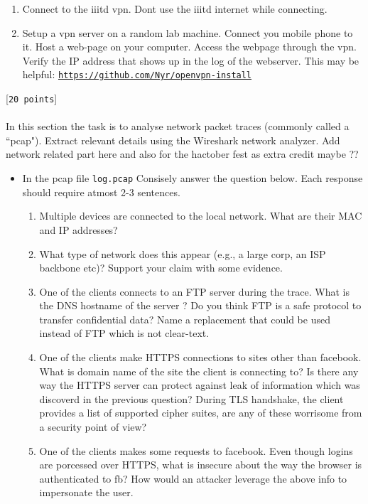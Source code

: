 \documentclass[11pt]{article}
\begin{document}
\begin{enumerate}
\begin{enumerate}
	\item {
			Connect to the iiitd vpn. Dont use the iiitd internet while connecting.
			}

	\item {
			Setup a vpn server on a random lab machine. Connect you mobile phone to it. Host a web-page on your computer. Access the webpage through the vpn. Verify the IP address that shows up in the log of the webserver. This may be helpful: \href{https://github.com/Nyr/openvpn-install}{\texttt{https://github.com/Nyr/openvpn-install}}

			}

	    
\end{enumerate}
 [\texttt{20 points}] \\\\
In this section the task is to analyse network packet traces (commonly called a ``pcap"). Extract relevant details using the Wireshark 
network analyzer.
Add network related part here and also for the hactober fest as extra credit maybe ??
\begin{itemize}
	\item {
			In the pcap file \texttt{log.pcap} Consisely answer the question below. Each response should require atmost 2-3 sentences.
			\begin{enumerate}
				\item Multiple devices are connected to the local network. What are their MAC and IP addresses?
				\item What type of network does this appear (e.g., a large corp, an ISP backbone etc)? Support your claim with some evidence.
				\item One of the clients connects to an FTP server during the trace. What is the DNS hostname of the server ? Do you think FTP is a
					safe protocol to transfer confidential data? Name a replacement that could be used instead of FTP which is not clear-text.
				\item One of the clients make HTTPS connections to sites other than facebook. What is domain name of the site the client is connecting to?
					Is there any way the HTTPS server can protect against leak of information which was discoverd in the previous question?
					During TLS handshake, the client provides a list of supported cipher suites, are any of these worrisome from a security point of view?
				\item One of the clients makes some requests to facebook. Even though logins are porcessed over HTTPS, what is insecure about the way the browser is authenticated to fb? How would an attacker leverage the above info to impersonate the user. 

\end{enumerate}}
\end{itemize}
\end{enumerate}
\end{document}
